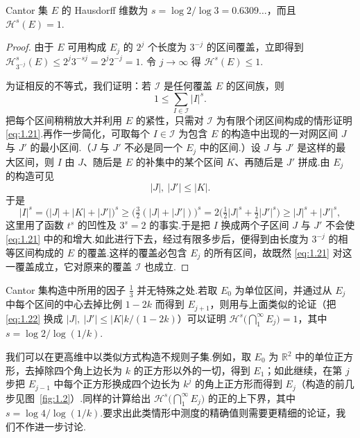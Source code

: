 \begin{theorem}\label{thm:1.14}
Cantor 集 $E$ 的 Hausdorff 维数为 $s=\log 2/\log 3=0.6309\ldots$，而且 $\mathcal{H}^s(E)=1$.
\end{theorem}

\begin{proof}
由于 $E$ 可用构成 $E_j$ 的 $2^j$ 个长度为 $3^{-j}$ 的区间覆盖，立即得到
$\mathcal{H}^s_{3^{-j}}(E)\leq 2^{j}3^{-sj}=2^{j}2^{-j}=1$.
令 $j\to\infty$ 得 $\mathcal{H}^s(E)\leq 1$.

为证相反的不等式，我们证明：若 $\mathcal{I}$ 是任何覆盖 $E$ 的区间族，则
\begin{equation}\label{eq:1.21}
  1\leq\sum_{I\in\mathcal{I}}|I|^{s}.
\end{equation}
把每个区间稍稍放大并利用 $E$ 的紧性，只需对 $\mathcal{I}$ 为有限个闭区间构成的情形证明 \eqref{eq:1.21}.再作一步简化，可取每个 $I\in\mathcal{I}$ 为包含 $E$ 的构造中出现的一对网区间 $J$ 与 $J'$ 的最小区间.（$J$ 与 $J'$ 不必是同一个 $E_j$ 中的区间.）设 $J$ 与 $J'$ 是这样的最大区间，则 $I$ 由 $J$、随后是 $E$ 的补集中的某个区间 $K$、再随后是 $J'$ 拼成.由 $E_j$ 的构造可见
\begin{equation}\label{eq:1.22}
  |J|,\ |J'|\leq|K|.
\end{equation}
于是
\[
  |I|^{s}=\bigl(|J|+|K|+|J'|\bigr)^{s}
  \geq\bigl(\tfrac{3}{2}(|J|+|J'|)\bigr)^{s}
  =2\bigl(\tfrac{1}{2}|J|^{s}+\tfrac{1}{2}|J'|^{s}\bigr)
  \geq|J|^{s}+|J'|^{s},
\]
这里用了函数 $t^s$ 的凹性及 $3^s=2$ 的事实.于是把 $I$ 换成两个子区间 $J$ 与 $J'$ 不会使 \eqref{eq:1.21} 中的和增大.如此进行下去，经过有限多步后，便得到由长度为 $3^{-j}$ 的相等区间构成的 $E$ 的覆盖.这样的覆盖必包含 $E_j$ 的所有区间，故既然 \eqref{eq:1.21} 对这一覆盖成立，它对原来的覆盖 $\mathcal{I}$ 也成立.
\end{proof}

Cantor 集构造中所用的因子 $\frac{1}{3}$ 并无特殊之处.若取 $E_0$ 为单位区间，并通过从 $E_j$ 中每个区间的中心去掉比例 $1-2k$ 而得到 $E_{j+1}$，则用与上面类似的论证（把 \eqref{eq:1.22} 换成 $|J|,\ |J'|\leq|K|k/(1-2k)$）可以证明 $\mathcal{H}^{s}\bigl(\bigcap_{1}^{\infty}E_j\bigr)=1$，其中 $s=\log 2/\log(1/k)$.

我们可以在更高维中以类似方式构造不规则子集.例如，取 $E_0$ 为 $\mathbb{R}^2$ 中的单位正方形，去掉除四个角上边长为 $k$ 的正方形以外的一切，得到 $E_1$；如此继续，在第 $j$ 步把 $E_{j-1}$ 中每个正方形换成四个边长为 $k^{j}$ 的角上正方形而得到 $E_j$（构造的前几步见图~\ref{fig:1.2}）.同样的计算给出 $\mathcal{H}^{s}\bigl(\bigcap_{1}^{\infty}E_j\bigr)$ 的正的上下界，其中 $s=\log 4/\log(1/k)$.要求出此类情形中测度的精确值则需要更精细的论证，我们不作进一步讨论.

